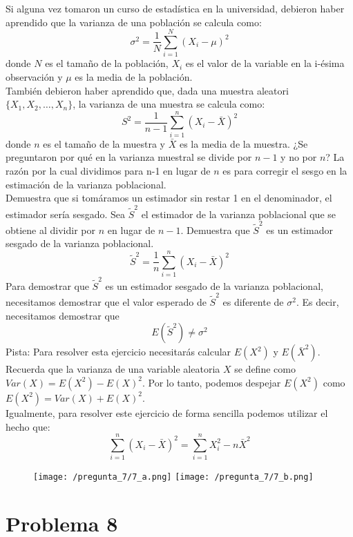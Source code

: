 \documentclass[]{article}
\begin{document}
Si alguna vez tomaron un curso de estadística en la universidad, debieron haber aprendido que la varianza de una población se calcula como: 
$$
\sigma^2=
	\frac{1}{N} 
	\sum_{i=1}^{N}
	(X_i-\mu)^2
$$
donde $N$ es el tamaño de la población, $X_i$ es el valor de la variable en la i-ésima observación y $\mu$ es la media de la población.
\\
También debieron haber aprendido que, dada una muestra aleatori $\{X_1, X_2, \ldots, X_n\}$, la varianza de una muestra se calcula como:
$$
S^2=
	\frac{1}{n-1}
	\sum_{i=1}^{n}
	(X_i-\bar{X})^2
$$
donde $n$ es el tamaño de la muestra y $\bar{X}$ es la media de la muestra. ¿Se preguntaron por qué en la varianza muestral se divide por $n-1$ y no por $n$? La razón por la cual dividimos para n-1 en lugar de $n$ es para corregir el sesgo en la estimación de la varianza poblacional.
\\
Demuestra que si tomáramos un estimador sin restar 1 en el denominador, el estimador sería sesgado. Sea $\tilde{S}^2$ el estimador de la varianza poblacional que se obtiene al dividir por $n$ en lugar de $n-1$. Demuestra que $\tilde{S}^2$ es un estimador sesgado de la varianza poblacional.
$$
\tilde{S}^2=
	\frac{1}{n}
	\sum_{i=1}^{n}	
	(X_i-\bar{X})^2
$$
Para demostrar que $\tilde{S}^2$ es un estimador sesgado de la varianza poblacional, necesitamos demostrar que el valor esperado de $\tilde{S}^2$ es diferente de $\sigma^2$. Es decir, necesitamos demostrar que
$$
E(\tilde{S}^2)\neq\sigma^2
$$
Pista: Para resolver esta ejercicio necesitarás calcular $E(X^2)$ y $E(\bar{X}^2)$. Recuerda que la varianza de una variable aleatoria $X$ se define como $Var(X)=E(X^2)-E(X)^2$. Por lo tanto, podemos despejar $E(X^2)$ como $E(X^2)=Var(X)+E(X)^2$.
\\
Igualmente, para resolver este ejercicio de forma sencilla podemos utilizar el hecho que: 
$$
\sum_{i=1}^{n} (X_i-\bar{X})^2=
	\sum_{i=1}^{n}
	X_{i}^{2}
	-
	n
	\bar{X}^2
$$ 

\begin{figure}[H]
	\centering
	\texttt{[image: /pregunta\_7/7\_a.png]}
	\vspace{0cm}
	\texttt{[image: /pregunta\_7/7\_b.png]}
\end{figure}



\section*{Problema 8}
\end{document}
